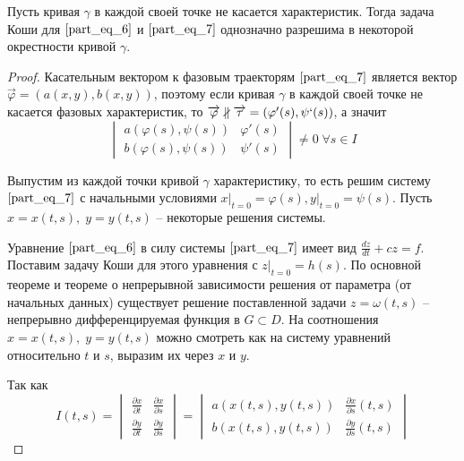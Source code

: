 \begin{theorem}
    Пусть кривая $\gamma$ в каждой своей точке не касается характеристик. Тогда задача Коши для $\eqref{part_eq_6}$ и $\eqref{part_eq_7}$ однозначно разрешима в некоторой окрестности кривой $\gamma$.
\end{theorem}
\begin{proof}
    Касательным вектором к фазовым траекторям $\eqref{part_eq_7}$ является вектор $\overrightarrow{\varphi} = \left( a(x, y), b(x, y) \right)$, поэтому если кривая $\gamma$ в каждой своей точке не касается фазовых характеристик, то $\overrightarrow{\varphi} \nparallel \overrightarrow{\tau} = (\varphi'(s), \psi`(s))$, а значит
    \begin{equation}
        \begin{vmatrix}
            a(\varphi(s), \psi(s)) & \varphi'(s) \\
            b(\varphi(s), \psi(s)) & \psi'(s)
        \end{vmatrix} \neq 0\; \forall s \in I
        \label{part_eq_8}
    \end{equation}
    
    Выпустим из каждой точки кривой $\gamma$ характеристику, то есть решим систему $\eqref{part_eq_7}$ с начальными условиями $x \big|_{t = 0} = \varphi(s), y \big|_{t = 0} = \psi(s)$. Пусть $x = x(t, s), \; y = y(t, s)$ -- некоторые решения системы.

    Уравнение $\eqref{part_eq_6}$ в силу системы $\eqref{part_eq_7}$ имеет вид $\frac{dz}{dt} + cz = f$. Поставим задачу Коши для этого уравнения с $z \big|_{t = 0} = h(s)$. По основной теореме и теореме о непрерывной зависимости решения от параметра (от начальных данных) существует решение поставленной задачи $z = \omega (t, s)$ -- непрерывно дифференцируемая функция в $G \subset D$. На соотношения $x = x(t, s), \; y = y(t, s)$ можно смотреть как на систему уравнений относительно $t$ и $s$, выразим их через $x$ и $y$.

    Так как
    \begin{equation*}
        I(t, s) =
        \begin{vmatrix}
            \frac{\partial x}{\partial t} & \frac{\partial x}{\partial s} \\
            \frac{\partial y}{\partial t} & \frac{\partial y}{\partial s}
        \end{vmatrix} =
        \begin{vmatrix}
            a(x(t, s), y(t, s)) & \frac{\partial x}{\partial s}(t, s) \\
            b(x(t, s), y(t, s)) & \frac{\partial y}{\partial s}(t, s)
        \end{vmatrix}
    \end{equation*}


\end{proof}
